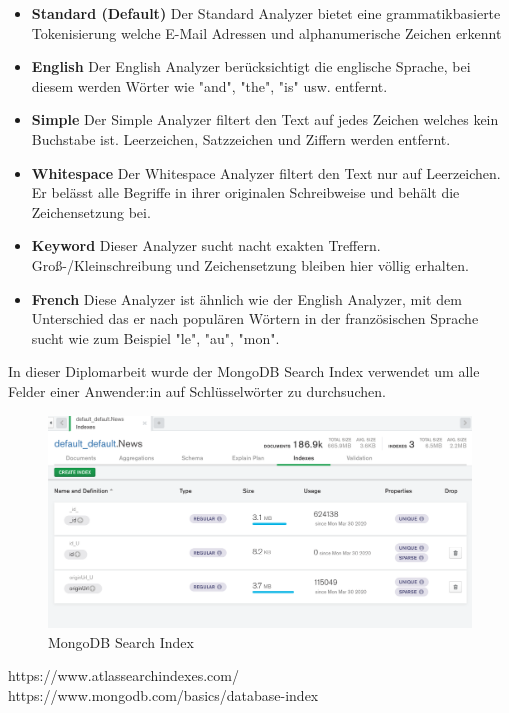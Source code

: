 \begin{itemize}
    \item \textbf{Standard (Default)}
        \newline
        Der Standard Analyzer bietet eine grammatikbasierte Tokenisierung welche E-Mail Adressen und alphanumerische Zeichen erkennt
    \item \textbf{English}
        \newline
        Der English Analyzer berücksichtigt die englische Sprache, bei diesem werden Wörter wie "and", "the", "is" usw. entfernt.
    \item \textbf{Simple}
        \newline
        Der Simple Analyzer filtert den Text auf jedes Zeichen welches kein Buchstabe ist. Leerzeichen, Satzzeichen und Ziffern werden entfernt.
    \item \textbf{Whitespace}
        \newline
        Der Whitespace Analyzer filtert den Text nur auf Leerzeichen. Er belässt alle Begriffe in ihrer originalen Schreibweise und behält die Zeichensetzung bei.
    \item \textbf{Keyword}
        \newline
        Dieser Analyzer sucht nacht exakten Treffern. Groß-/Kleinschreibung und Zeichensetzung bleiben hier völlig erhalten.
    \item \textbf{French}
        \newline
        Diese Analyzer ist ähnlich wie der English Analyzer, mit dem Unterschied das er nach populären Wörtern in der französischen Sprache sucht wie zum Beispiel "le", "au", "mon".
\end{itemize}





In dieser Diplomarbeit wurde der MongoDB Search Index verwendet um alle Felder einer Anwender:in auf Schlüsselwörter zu durchsuchen.

\begin{figure}[h!]
    \centering
    \includegraphics[width=1\linewidth]{pics/mongodb-search-indizes.png}
    \caption{MongoDB Search Index}
    \label{fig:enter-label}
\end{figure}





https://www.atlassearchindexes.com/
https://www.mongodb.com/basics/database-index